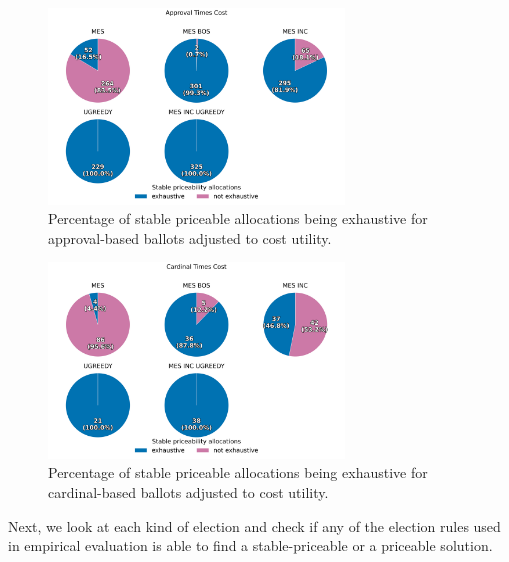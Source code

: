 \begin{figure}[H]         
  \centering              
  \includegraphics[width=0.7\textwidth]{figures/plots/approval-times-cost/approval_times_cost_stability_pies.png}
  \caption{Percentage of stable priceable allocations being exhaustive for approval-based ballots adjusted to cost utility.}
  \label{fig:myplot}
\end{figure}

\begin{figure}[H]         
  \centering              
  \includegraphics[width=0.7\textwidth]{figures/plots/cardinal-times-cost/cardinal_times_cost_stability_pies.png}
  \caption{Percentage of stable priceable allocations being exhaustive for cardinal-based ballots adjusted to cost utility.}
  \label{fig:myplot}
\end{figure}


Next, we look at each kind of election and check if any of the election rules used in empirical evaluation is able to find a stable-priceable or a priceable solution.

